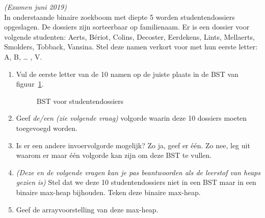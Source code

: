\begin{oef}
\papier \emph{(Examen juni 2019)}\\
In onderstaande binaire zoekboom met diepte 5 worden studentendossiers opgeslagen. De dossiers zijn sorteerbaar op familienaam. Er is een dossier voor volgende studenten: Aerts, Bériot, Colins, Decoster, Eerdekens, Lints, Mellaerts, Smolders, Tobback, Vansina. Stel deze namen verkort voor met hun eerste letter: A, B, … , V.

\begin{enumerate}
\item Vul de eerste letter van de 10 namen op de juiste plaats in de BST van figuur~\ref{fig:bstexjuni19}.
\begin{figure}[htbp] 
    \centering
{}
\caption{BST voor studentendossiers}
    \label{fig:bstexjuni19}
\end{figure}


\item Geef \emph{de/een (zie volgende vraag)} volgorde waarin deze 10 dossiers moeten toegevoegd worden. 


\item Is er een andere invoervolgorde mogelijk? Zo ja, geef er één. Zo nee, leg uit waarom er maar één volgorde kan zijn om deze BST te vullen.


\item \emph{(Deze en de volgende vragen kan je pas beantwoorden als de leerstof van heaps gezien is)} Stel dat we deze 10 studentendossiers niet in een BST maar in een binaire max-heap bijhouden. Teken deze binaire max-heap. 

\item Geef de arrayvoorstelling van deze max-heap.


\end{enumerate}
\end{oef}
